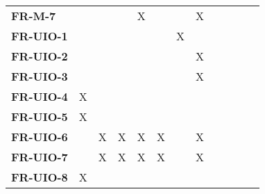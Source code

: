 \documentclass[12pt, titlepage]{article}
\begin{document}
\begin{table}[H]
\begin{adjustbox}{max width=0.7\paperwidth}
\begin{tabular}{l|ccccccccccc}
        \textbf{FR-M-7}    & ~ & ~ & ~ & X & ~ & ~ & X & ~\\
        \textbf{FR-UIO-1}  & ~ & ~ & ~ & ~ & ~ & X & ~ & ~\\
        \textbf{FR-UIO-2}  & ~ & ~ & ~ & ~ & ~ & ~ & X & ~\\
        \textbf{FR-UIO-3}  & ~ & ~ & ~ & ~ & ~ & ~ & X & ~\\
        \textbf{FR-UIO-4}  & X & ~ & ~ & ~ & ~ & ~ & ~ & ~\\
        \textbf{FR-UIO-5}  & X & ~ & ~ & ~ & ~ & ~ & ~ & ~\\
        \textbf{FR-UIO-6}  & ~ & X & X & X & X & ~ & X & ~\\
        \textbf{FR-UIO-7}  & ~ & X & X & X & X & ~ & X & ~\\
        \textbf{FR-UIO-8}  & X & ~ & ~ & ~ & ~ & ~ & ~ & ~\\
    \end{tabular}
    \end{adjustbox}
\end{table}
\end{document}
